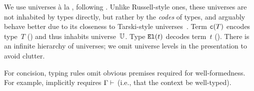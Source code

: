 We use universes à la \citet{coquand2013presheaf}, following \citet{kaposi2019gluing}.
Unlike Russell-style ones, these universes are not inhabited by types directly,
but rather by the \emph{codes} of types,
and arguably behave better due to its closeness to Tarski-style universes~\cite{luo2012notes}. 
Term $\texttt{c}({T})$ encodes type~$T$ () and thus inhabits universe~$\mathbb{U}$.
Type $\texttt{El}({t})$ decodes term~$t$ ().
There is an infinite hierarchy of universes;
we omit universe levels in the presentation to avoid clutter.

For concision, typing rules omit obvious premises required for well-formedness.
For example,  implicitly requires $ {\Gamma} \vdash_{} $
(i.e., that the context be well-typed).

